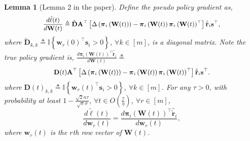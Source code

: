 \documentclass[10pt]{article}
\def\rvs{{\mathbf{s}}}
\def\rvw{{\mathbf{w}}}
\def\rvtilder{{\tilde{\mathbf{r}}}}
\newtheorem{lem}{Lemma}
\def\rvpi{{\boldsymbol{\pi}}}
\def\rmA{{\mathbf{A}}}
\def\rmD{{\mathbf{D}}}
\def\rmW{{\mathbf{W}}}
\def\sI{{\mathbb{I}}}
\begin{document}
\begin{lem}[Lemma 2 in the paper]
\label{lem:gradient_coupling}
	Define the pseudo policy gradient as,
\begin{equation*}
\begin{split}
\small
	\frac{d \tilde{\ell}(t)}{d \rmW(t)} \triangleq \tilde{\rmD} \rmA^\top \left[ \Delta\left( \rvpi_i\left(\rmW(t)\right) \right) - \rvpi_i\left(\rmW(t)\right) \rvpi_i\left(\rmW(t)\right)^\top \right] \hat{\rvtilder}_i \rvs^\top,
\end{split}
\end{equation*}
where $\tilde{\rmD}_{k,k} \triangleq \sI\left\{ \rvw_r(0)^\top \rvs_i > 0 \right\}$, $\forall k \in [m]$, is a diagonal matrix. Note the true policy gradient is, $\frac{d \rvpi_i\left(\rmW(t)\right)^\top \hat{\rvtilder}_i}{d \rmW(t)} \triangleq $
\begin{equation*}
\begin{split}
\small
    \rmD(t) \rmA^\top \left[ \Delta\left( \rvpi_i\left(\rmW(t)\right) \right) - \rvpi_i\left(\rmW(t)\right) \rvpi_i\left(\rmW(t)\right)^\top \right] \hat{\rvtilder}_i \rvs^\top.
\end{split}
\end{equation*}
where $\rmD(t)_{k,k} \triangleq \sI\left\{ \rvw_r(t)^\top \rvs_i > 0 \right\}$, $\forall k \in [m]$. For any $\tau > 0$, with probability at least $1 - \frac{\sqrt{2}n\tau}{\sqrt{\pi}\sigma}$, $\forall t \in O\left(\frac{\tau}{\eta}\right)$, $\forall r \in [m]$,
\begin{equation*}
	\frac{d\tilde{\ell}(t)}{d \rvw_r(t)} = \frac{d \rvpi_i\left(\rmW(t)\right)^\top \hat{\rvtilder}_i}{d \rvw_r(t)},
\end{equation*}
where $\rvw_r(t)$ is the $r$th row vector of $\rmW(t)$.
\end{lem}
\end{document}

